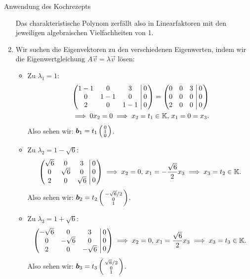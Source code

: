 \begin{Beispiel}{Anwendung des Kochrezepts}
\begin{enumerate}
\begin{equation*}
    \end{equation*}
    Das charakteristische Polynom zerfällt also in Linearfaktoren mit den jeweiligen algebraischen Vielfachheiten von 1.
    \item Wir suchen die Eigenvektoren zu den verschiedenen Eigenwerten, indem wir die Eigenwertgleichung $A\Vec{v}=\lambda \Vec{v}$ lösen:
    \begin{itemize}
        \item Zu $\lambda_1=1$:
        \begin{align*}
            &\left(\begin{matrix}1-1&0&3\\0&1-1&0\\2&0&1-1\end{matrix}\,\left|\,\begin{matrix}0\\0\\0\end{matrix}\right.\right)=\left(\begin{matrix}0&0&3\\0&0&0\\2&0&0\end{matrix}\,\left|\,\begin{matrix}0\\0\\0\end{matrix}\right.\right)\\
            &\implies 0x_2=0\implies x_2=t_1\in\mathbb{K},\,x_1=0=x_3.
        \end{align*}
        Also sehen wir: ${{\text{\boldmath${b}$}}}_1=t_1\left(\begin{smallmatrix}0\\1\\0\end{smallmatrix}\right)$.
        \item Zu $\lambda_2=1-\sqrt{6}$:
        \begin{equation*}
            \left(\begin{matrix}\sqrt{6}&0&3\\0&\sqrt{6}&0\\2&0&\sqrt{6}\end{matrix}\,\left|\,\begin{matrix}0\\0\\0\end{matrix}\right.\right)\implies x_2=0,\, x_1=-\frac{\sqrt{6}}{2}x_3\implies x_3=t_2\in\mathbb{K}.
        \end{equation*}
        Also sehen wir: ${{\text{\boldmath${b}$}}}_2=t_2\left(\begin{smallmatrix}-\sqrt{6}/2\\0\\1\end{smallmatrix}\right)$.
        \item Zu $\lambda_3=1+\sqrt{6}$:
        \begin{equation*}
            \left(\begin{matrix}-\sqrt{6}&0&3\\0&-\sqrt{6}&0\\2&0&-\sqrt{6}\end{matrix}\,\left|\,\begin{matrix}0\\0\\0\end{matrix}\right.\right)\implies x_2=0,\, x_1=\frac{\sqrt{6}}{2}x_3\implies x_3=t_3\in\mathbb{K}.
        \end{equation*}
        Also sehen wir: ${{\text{\boldmath${b}$}}}_3=t_3\left(\begin{smallmatrix}\sqrt{6}/2\\0\\1\end{smallmatrix}\right)$.

\end{itemize}
\end{enumerate}
\end{Beispiel}
